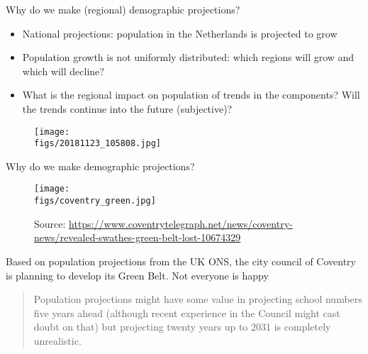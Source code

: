 \documentclass[final, 12pt, aspectratio=169, xcolor={dvipsnames}]{beamer}
\newcommand*{\figs}{../figs}%
\newcommand{\source}[1]{\caption*{\tiny Source: {#1}} }
\begin{document}
\begin{frame}{Why do we make (regional) demographic projections?}
    \begin{minipage}[t]{0.48\linewidth}%
      \begin{itemize}
      \item National projections: population in the Netherlands is projected to grow
      \item Population growth is not uniformly distributed: which regions will grow and which will decline?
      \item What is the regional impact on population of trends in the components? Will the trends continue into the future (subjective)?
  \end{itemize}
 
\end{minipage}%
\hfill%
\begin{minipage}[t]{0.48\linewidth}
       \begin{figure}
        \texttt{[image: \\figs/20181123\_105808.jpg]}        
      \end{figure}

\end{minipage}  
\end{frame}

\begin{frame}{Why do we make demographic projections?}
  \begin{minipage}[t]{0.48\linewidth}%
    \begin{figure}
      \texttt{[image: \\figs/coventry\_green.jpg]}
      \source{\url{https://www.coventrytelegraph.net/news/coventry-news/revealed-swathes-green-belt-lost-10674329}}
    \end{figure}
\end{minipage}%
\hfill%
\begin{minipage}[t]{0.48\linewidth}
  \small
  Based on population projections from the UK ONS, the city council of Coventry is planning to develop its Green Belt. Not everyone is happy \\
  \begin{quotation}
    Population projections might have some
value in projecting school numbers five years ahead (although recent experience in the Council
might cast doubt on that) but projecting twenty years up to 2031 is completely unrealistic. \href{http://www.coventrysociety.org.uk/js/plugins/filemanager/files/information/Coventry_Local_Plan_2014_Response_-_final_with_corrections.pdf}{}     
    \end{quotation}
  
\end{minipage}
  
\end{frame}
\end{document}
